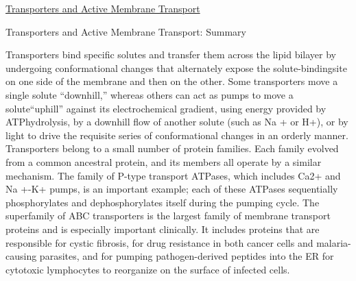 \documentclass[12pt,letterpaper]{article}
\begin{document}
\begin{secbox}{\hyperlink{11}{Transporters and Active Membrane Transport}}
{    \begin{probbox}{Transporters and Active Membrane Transport: Summary}\end{probbox}
        Transporters bind specific solutes and transfer them across the lipid bilayer by undergoing conformational changes that alternately expose the solute-bindingsite on one side of the membrane and then on the other. Some transporters move a single solute “downhill,” whereas others can act as pumps to move a solute“uphill” against its electrochemical gradient, using energy provided by ATPhydrolysis, by a downhill flow of another solute (such as Na + or H+), or by light to drive the requisite series of conformational changes in an orderly manner. Transporters belong to a small number of protein families. Each family evolved from a common ancestral protein, and its members all operate by a similar mechanism. The family of P-type transport ATPases, which includes Ca2+ and Na +-K+ pumps, is an important example; each of these ATPases sequentially phosphorylates and dephosphorylates itself during the pumping cycle. The superfamily of ABC transporters is the largest family of membrane transport proteins and is especially important clinically. It includes proteins that are responsible for cystic fibrosis, for drug resistance in both cancer cells and malaria-causing parasites, and for pumping pathogen-derived peptides into the ER for cytotoxic lymphocytes to reorganize on the surface of infected cells.
}\end{secbox}
\end{document}

